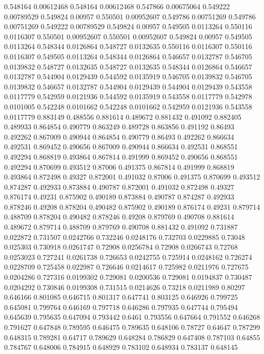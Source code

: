 0.548164 0.00612468
0.548164 0.00612468
0.547866 0.00675064
0.549222 0.00789529
0.549824 0.00957
0.550501 0.00952607
0.549786 0.00751269
0.549786 0.00751269
0.549222 0.00789529
0.549824 0.00957
0.549505 0.0113264
0.550116 0.0116307
0.550501 0.00952607
0.550501 0.00952607
0.549824 0.00957
0.549505 0.0113264
0.548344 0.0126864
0.548727 0.0132635
0.550116 0.0116307
0.550116 0.0116307
0.549505 0.0113264
0.548344 0.0126864
0.546657 0.0132787
0.546705 0.0139832
0.548727 0.0132635
0.548727 0.0132635
0.548344 0.0126864
0.546657 0.0132787
0.544904 0.0129439
0.544592 0.0135919
0.546705 0.0139832
0.546705 0.0139832
0.546657 0.0132787
0.544904 0.0129439
0.544904 0.0129439
0.543558 0.0117779
0.542959 0.0121936
0.544592 0.0135919
0.543558 0.0117779
0.542978 0.0101005
0.542248 0.0101662
0.542248 0.0101662
0.542959 0.0121936
0.543558 0.0117779
0.883149 0.488556
0.881614 0.489672
0.881432 0.491092
0.882405 0.489933
0.864854 0.490779
0.863249 0.489728
0.863856 0.491192
0.86493 0.492262
0.867009 0.490944
0.864854 0.490779
0.86493 0.492262
0.866634 0.492531
0.869452 0.490656
0.867009 0.490944
0.866634 0.492531
0.868551 0.492294
0.868819 0.493864
0.867814 0.491999
0.869452 0.490656
0.868551 0.492294
0.870699 0.493512
0.87006 0.491375
0.867814 0.491999
0.868819 0.493864
0.872498 0.49327
0.872001 0.491032
0.87006 0.491375
0.870699 0.493512
0.874287 0.492933
0.873884 0.490787
0.872001 0.491032
0.872498 0.49327
0.876174 0.49231
0.875902 0.490189
0.873884 0.490787
0.874287 0.492933
0.878246 0.49208
0.878204 0.490482
0.875902 0.490189
0.876174 0.49231
0.879714 0.488709
0.878204 0.490482
0.878246 0.49208
0.879769 0.490708
0.881614 0.489672
0.879714 0.488709
0.879769 0.490708
0.881432 0.491092
0.731887 0.022872
0.731507 0.0242766
0.732246 0.0248176
0.732703 0.0229885
0.73048 0.025303
0.730918 0.0261747
0.72908 0.0256784
0.72908 0.0266743
0.72768 0.0253023
0.727241 0.0261738
0.726653 0.0242755
0.725914 0.0248162
0.726274 0.0228709
0.725458 0.022987
0.726646 0.0214617
0.725982 0.0211976
0.727675 0.0204286
0.727316 0.0199302
0.729081 0.0200536
0.729081 0.0194837
0.730487 0.0204292
0.730846 0.0199308
0.731515 0.0214626
0.73218 0.0211989
0.80297 0.646166
0.801085 0.646715
0.801317 0.647741
0.803125 0.646926
0.799725 0.645081
0.799764 0.646169
0.797718 0.646286
0.797935 0.647744
0.795494 0.645639
0.795635 0.647094
0.793442 0.6461
0.793556 0.647664
0.791552 0.646268
0.791627 0.647848
0.789595 0.646475
0.789635 0.648106
0.78727 0.64647
0.787299 0.648315
0.789281 0.64717
0.789629 0.648284
0.786829 0.647408
0.787103 0.64855
0.784767 0.648006
0.784915 0.648929
0.783102 0.648934
0.783137 0.648145
